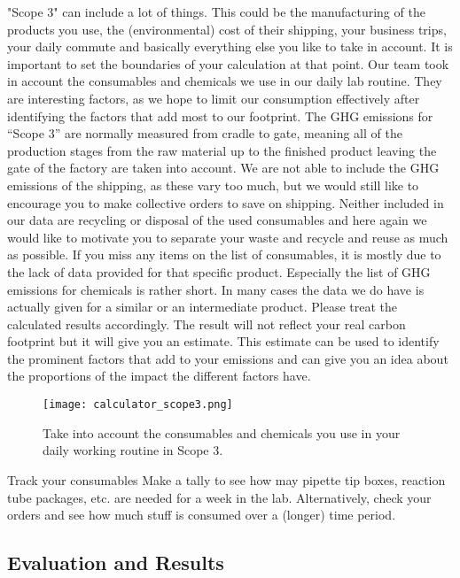 "Scope 3" can include a lot of things. This could be the manufacturing of the products you use, the (environmental) cost of their shipping, your business trips, your daily commute and basically everything else you like to take in account. It is important to set the boundaries of your calculation at that point. Our team took in account the consumables and chemicals we use in our daily lab routine. They are interesting factors, as we hope to limit our consumption effectively after identifying the factors that add most to our footprint. The GHG emissions for “Scope 3” are normally measured from cradle to gate, meaning all of the production stages from the raw material up to the finished product leaving the gate of the factory are taken into account. We are not able to include the GHG emissions of the shipping, as these vary too much, but we would still like to encourage you to make collective orders to save on shipping. Neither included in our data are recycling or disposal of the used consumables and here again we would like to motivate you to separate your waste and recycle and reuse as much as possible. If you miss any items on the list of consumables, it is mostly due to the lack of data provided for that specific product. Especially the list of GHG emissions for chemicals is rather short. In many cases the data we do have is actually given for a similar or an intermediate product. Please treat the calculated results accordingly. The result will not reflect your real carbon footprint but it will give you an estimate. This estimate can be used to identify the prominent factors that add to your emissions and can give you an idea about the proportions of the impact the different factors have.

\begin{figure}[h!]
	\centering
	\texttt{[image: calculator\_scope3.png]}%
	\caption{Take into account the consumables and chemicals you use in your daily working routine in Scope 3.}%
\end{figure}

\begin{suggest}{Track your consumables}
	Make a tally to see how may pipette tip boxes, reaction tube packages, etc. are needed for a week in the lab. Alternatively, check your orders and see how much stuff is consumed over a (longer) time period.
\end{suggest}

\clearpage
\subsection{Evaluation and Results}

